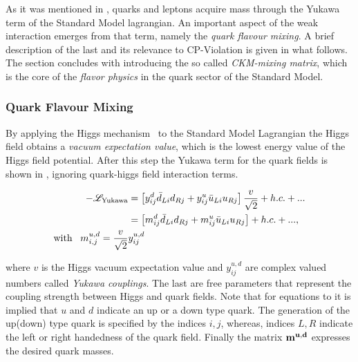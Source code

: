 As it was mentioned in , quarks and leptons acquire mass through the Yukawa term
of the Standard Model lagrangian. An important aspect of the weak interaction emerges from that term,
namely the {\it quark flavour mixing}. A brief description of the last and its relevance to CP-Violation is given in what follows.
The section concludes with introducing the so called {\it CKM-mixing matrix}, which is the core of the
{\it flavor physics} in the quark sector of the Standard Model.

\subsubsection{Quark Flavour Mixing}
By applying the Higgs mechanism~\cite{PhysRevLett.13.321,PhysRevLett.13.508} to the Standard Model Lagrangian the Higgs field obtains a
{\it vacuum expectation value}, which is the lowest energy value of the Higgs field potential.
After this step the Yukawa term for the quark fields is shown in ,
 ignoring quark-higgs field interaction terms.

\begin{subequations}
\label{yukawa_flavour}
\centering
  \begin{align}
  -\mathscr{L}_{\text{Yukawa}} &= \left[ y_{ij}^d \bar{d}_{Li} d_{Rj} + y_{ij}^u \bar{u}_{Li} u_{Rj} \right] \frac{v}{\sqrt{2}} + h.c. + ...  \\
                               &= \left[ m_{ij}^d \bar{d}_{Li} d_{Rj} + m_{ij}^u \bar{u}_{Li} u_{Rj} \right] + h.c. + ...,  \\
                               \text{with} \;\;\; m^{u,d}_{i,j} = \frac{v}{\sqrt{2}} & y_{ij}^{u,d} \nonumber
  \end{align}
\end{subequations}

\noindent where $v$ is the Higgs vacuum expectation value and $y_{ij}^{u,d}$ are complex valued numbers called {\it Yukawa couplings}.
The last are free parameters that represent the coupling strength between Higgs and quark fields.
Note that for equations  to  it is implied that $u$ and $d$ indicate
an up or a down type quark. The generation of the up(down) type quark is specified by the indices $i,j$,
whereas, indices $L,R$ indicate the left or right handedness of the quark field.
Finally the matrix $\bf m^{u,d}$ expresses the desired quark masses.

